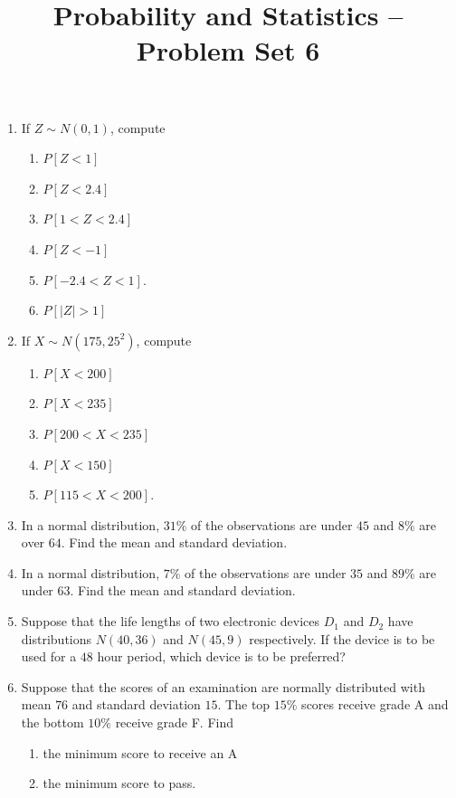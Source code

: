 \documentclass[svgnames]{amsart}
\title[]{Probability and Statistics -- Problem Set 6}
\begin{document}
\maketitle
\begin{enumerate}[leftmargin=*]
\item If $Z \sim N(0,1)$, compute
\begin{enumerate}
	\item $P[Z < 1]$
	\item $P[Z < 2.4]$
	\item $P[1 < Z < 2.4]$
	\item $P[Z < -1]$
	\item $P[-2.4 < Z < 1]$.
	\item $P[|Z| > 1]$
\end{enumerate}

\item If $X \sim N(175, 25^2)$, compute
\begin{enumerate}
	\item $P[X < 200]$
	\item $P[X < 235]$
	\item $P[200 < X < 235]$
	\item $P[X < 150]$
	\item $P[115 < X < 200]$.
\end{enumerate}

\item In a normal distribution, $31\%$ of the observations are under $45$ and $8\%$ are over $64$. Find the mean and standard deviation.

\item In a normal distribution, $7\%$ of the observations are under $35$ and $89\%$ are under $63$. Find the mean and standard deviation.

\item Suppose that the life lengths of two electronic devices $D_1$ and $D_2$ have distributions $N(40, 36)$ and $N(45, 9)$ respectively. If the device is to be used for a $48$ hour period, which device is to be preferred?

\item Suppose that the scores of an examination are normally distributed with mean $76$ and standard deviation $15$. The top $15\%$ scores receive grade A and the bottom $10\%$ receive grade F. Find
\begin{enumerate}
	\item the minimum score to receive an A
	\item the minimum score to pass.
\end{enumerate}


\end{enumerate}
\end{document}
